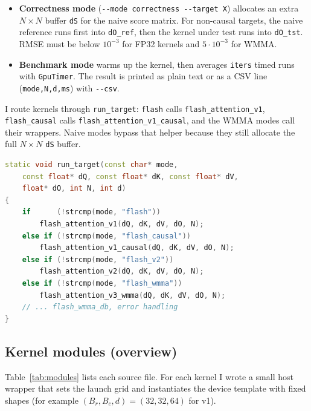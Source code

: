 \documentclass[12pt]{article}
\begin{document}
\begin{itemize}
    \item \textbf{Correctness mode} (\verb|--mode correctness --target X|) allocates an extra $N{\times}N$ buffer \texttt{dS} for the naive score matrix. For non-causal targets, the naive reference runs first into \texttt{dO\_ref}, then the kernel under test runs into \texttt{dO\_tst}. RMSE must be below $10^{-3}$ for FP32 kernels and $5{\cdot}10^{-3}$ for WMMA.
    \item \textbf{Benchmark mode} warms up the kernel, then averages \texttt{iters} timed runs with \texttt{GpuTimer}. The result is printed as plain text or as a CSV line (\texttt{mode,N,d,ms}) with \verb|--csv|.
\end{itemize}

I route kernels through \texttt{run\_target}: \texttt{flash} calls \texttt{flash\_attention\_v1}, \texttt{flash\_causal} calls \texttt{flash\_attention\_v1\_causal}, and the WMMA modes call their wrappers. Naive modes bypass that helper because they still allocate the full $N{\times}N$ \texttt{dS} buffer.

\begin{lstlisting}[language=C++, basicstyle=\ttfamily\footnotesize, frame=single,
  commentstyle=\color{green!60!black}]
static void run_target(const char* mode,
    const float* dQ, const float* dK, const float* dV,
    float* dO, int N, int d)
{
    if      (!strcmp(mode, "flash"))
        flash_attention_v1(dQ, dK, dV, dO, N);
    else if (!strcmp(mode, "flash_causal"))
        flash_attention_v1_causal(dQ, dK, dV, dO, N);
    else if (!strcmp(mode, "flash_v2"))
        flash_attention_v2(dQ, dK, dV, dO, N);
    else if (!strcmp(mode, "flash_wmma"))
        flash_attention_v3_wmma(dQ, dK, dV, dO, N);
    // ... flash_wmma_db, error handling
}
\end{lstlisting}

\subsection{Kernel modules (overview)}

Table~\ref{tab:modules} lists each source file. For each kernel I wrote a small host wrapper that sets the launch grid and instantiates the device template with fixed shapes (for example $(B_r, B_c, d) = (32, 32, 64)$ for v1).
\end{document}
